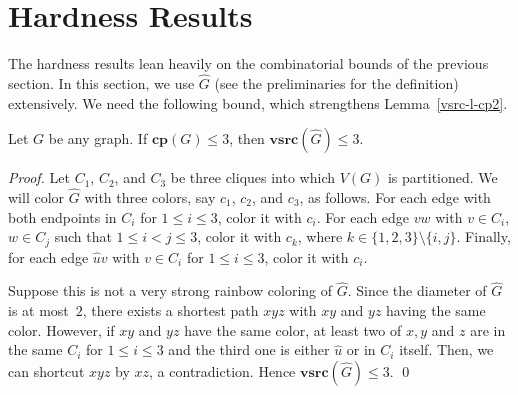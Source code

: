 \documentclass[letter,runningheads,envcountsame,envcountsect]{llncs}
\newcommand{\vsrc}{\mathbf{vsrc}}
\newcommand{\cp}{\mathbf{cp}}
\begin{document}
\section{Hardness Results}\label{sec:hardness}
The hardness results lean heavily on the combinatorial bounds of the previous section. 
In this section, we use $\hat{G}$ (see the preliminaries for the definition) extensively.
We need the following bound, which strengthens Lemma~\ref{vsrc-l-cp2}.


\begin{lemma}\label{cp-3-vsrc}
Let $G$ be any graph. If $\cp(G) \leq 3$, then $\vsrc(\hat{G})\le 3$.
\end{lemma}
\begin{proof}
	Let $C_1$, $C_2$, and $C_3$ be three cliques into which $V(G)$ is partitioned. We will color $\hat{G}$ with three colors, say $c_1$, $c_2$, and $c_3$, as follows. For each edge with both endpoints in $C_i$ for $1\le i\le 3$, color it with $c_i$. For each edge $vw$ with $v \in C_i$, $w \in C_j$ such that $1 \le i < j \le 3$, color it with $c_k$, where $k \in \{1,2,3\} \setminus \{i,j\}$. Finally, for each edge $\hat{u}v$ with $v\in C_i$ for $1\le i\le 3$, color it with $c_i$. 

Suppose this is not a very strong rainbow coloring of $\hat{G}$. Since the diameter of $\hat{G}$ is at most~$2$, there exists a shortest path $xyz$ with $xy$ and $yz$ having the same color. However, if $xy$ and $yz$ have the same color, at least two of $x,y$ and $z$ are in the same $C_i$ for $1\le i\le 3$ and the third one is either $\hat{u}$ or in $C_i$ itself. Then, we can shortcut $xyz$ by $xz$, a contradiction. 
	 Hence $\vsrc(\hat{G}) \leq 3$.
\qed\end{proof}
\end{document}
